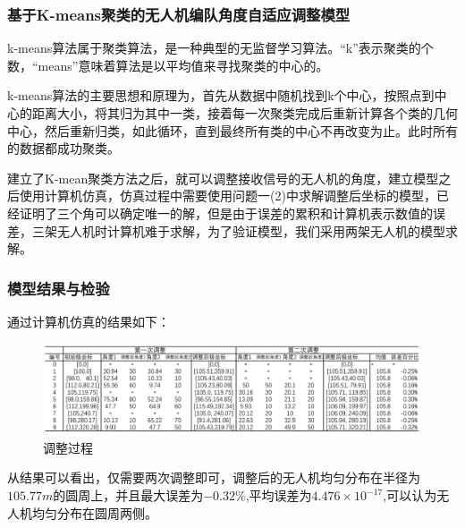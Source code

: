 \documentclass[withoutpreface,bwprint]{cumcmthesis} %
\begin{document}
\subsubsection{基于K-means聚类的无人机编队角度自适应调整模型}
k-means算法属于聚类算法，是一种典型的无监督学习算法。“k”表示聚类的个数，“means”意味着算法是以平均值来寻找聚类的中心的。

k-means算法的主要思想和原理为，首先从数据中随机找到k个中心，按照点到中心的距离大小，将其归为其中一类，接着每一次聚类完成后重新计算各个类的几何中心，然后重新归类，如此循环，直到最终所有类的中心不再改变为止。此时所有的数据都成功聚类。

建立了K-mean聚类方法之后，就可以调整接收信号的无人机的角度，建立模型之后使用计算机仿真，仿真过程中需要使用问题一(2)中求解调整后坐标的模型，已经证明了三个角可以确定唯一的解，但是由于误差的累积和计算机表示数值的误差，三架无人机时计算机难于求解，为了验证模型，我们采用两架无人机的模型求解。


\subsubsection{模型结果与检验}
通过计算机仿真的结果如下：
\begin{figure}[H]
	\centering
	\includegraphics[width=1\textwidth]{8}
	\caption{调整过程}
	\label{8}
\end{figure}
从结果可以看出，仅需要两次调整即可，调整后的无人机均匀分布在半径为$105.77m$的圆周上，并且最大误差为$-0.32\%$,平均误差为$4.476 \times 10^{-17}$,可以认为无人机均匀分布在圆周两侧。
\end{document}

